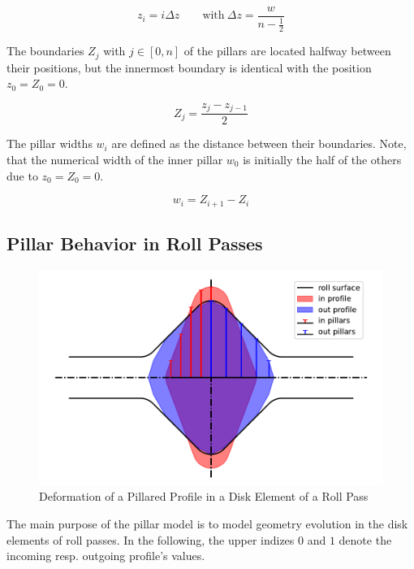 \documentclass[11pt]{PyRollDocs}
\begin{document}
    \begin{equation}
        z_i = i \Delta z
        \qquad\text{with}\
        \Delta z = \frac{w}{n - \frac{1}{2}}
        \label{eq:pillars}
    \end{equation}

    The boundaries $Z_j$ with $j \in [0, n]$ of the pillars are located halfway between their positions, but the innermost boundary is identical with the position $z_0 = Z_0 = 0$.

    \begin{equation}
        Z_j = \frac{z_j - z_{j-1}}{2}
        \label{eq:pillar_boundaries}
    \end{equation}

    The pillar widths $w_i$ are defined as the distance between their boundaries.
    Note, that the numerical width of the inner pillar $w_0$ is initially the half of the others due to $z_0 = Z_0 = 0$.

    \begin{equation}
        w_i = Z_{i+1} - Z_i
        \label{eq:pillar_widths}
    \end{equation}

    \subsection{Pillar Behavior in Roll Passes}\label{subsec:pillar-behavior-in-roll-passes}

    \begin{figure}
        \centering
        \includegraphics[width=0.6\linewidth]{img/pillar_disk_element}
        \caption{Deformation of a Pillared Profile in a Disk Element of a Roll Pass}
        \label{fig:pillar_disk_element}
    \end{figure}

    The main purpose of the pillar model is to model geometry evolution in the disk elements of roll passes.
    In the following, the upper indizes $0$ and $1$ denote the incoming resp. outgoing profile's values.
\end{document}
